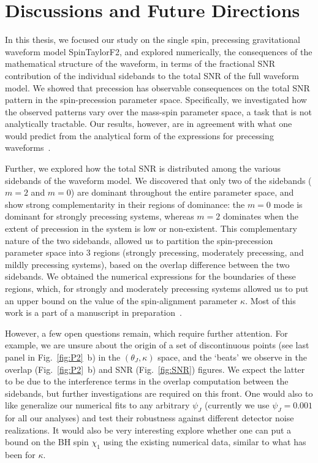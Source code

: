 
\chapter{Discussions and Future Directions}

In this thesis, we focused our study on the single spin, precessing
gravitational waveform model SpinTaylorF2, and explored numerically, the
consequences of the mathematical structure of the waveform, in terms of the
fractional SNR contribution of the individual sidebands to the total SNR of
the full waveform model. We showed that precession has observable consequences
on the total SNR pattern in the spin-precession parameter space. Specifically,
we investigated how the observed patterns vary over the mass-spin parameter
space, a task that is not analytically tractable. Our results, however, are in
agreement with what one would predict from the analytical form of the
expressions for precessing waveforms~\cite{Apostolatos1994}.

Further, we explored how the total SNR is distributed among the various
sidebands of the waveform model. We discovered that only two of the sidebands
($m=2$ and $m=0$) are dominant throughout the entire parameter space, and show
strong complementarity in their regions of dominance: the $m=0$ mode is
dominant for strongly precessing systems, whereas $m=2$ dominates when the
extent of precession in the system is low or non-existent. This complementary
nature of the two sidebands, allowed us to partition the spin-precession
parameter space into 3 regions (strongly precessing, moderately precessing,
and mildly precessing systems), based on the overlap difference between the
two sidebands. We obtained the numerical expressions for the boundaries of
these regions, which, for strongly and moderately precessing systems allowed
us to put an upper bound on the value of the spin-alignment parameter
$\kappa$. Most of this work is a part of a manuscript in
preparation~\cite{STF2}.

However, a few open questions remain, which require further attention. For
example, we are unsure about the origin of a set of discontinuous points (see
last panel in Fig.~\ref{fig:P2}~b) in the $(\theta_J,
\kappa)$ space, and the `beats' we observe in the overlap
(Fig.~\ref{fig:P2}~b) and SNR (Fig.~\ref{fig:SNR}) figures. We expect the
latter to be due to the interference terms in the overlap computation between
the sidebands, but further investigations are required on this front. One
would also to like generalize our numerical fits to any arbitrary $\psi_J$
(currently we use $\psi_J = 0.001$ for all our analyses) and test their
robustness against different detector noise realizations. It would also be
very interesting explore whether one can put a bound on the BH spin $\chi_1$
using the existing numerical data, similar to what has been for $\kappa$.

